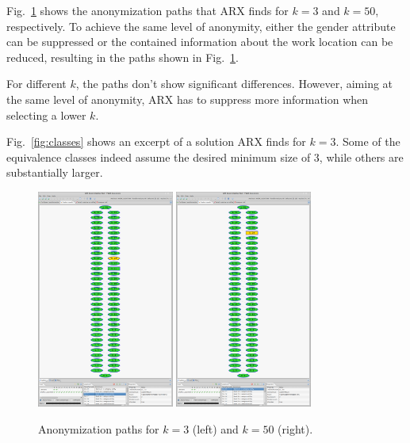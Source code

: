 \documentclass[parskip=full]{scrartcl}
\begin{document}
Fig.~\ref{fig:paths} shows the anonymization paths that ARX finds for $k=3$ and $k=50$, respectively. To achieve the same level of anonymity, either the gender attribute can be suppressed or the contained information about the work location can be reduced, resulting in the paths shown in Fig.~\ref{fig:paths}.

For different $k$, the paths don't show significant differences. However, aiming at the same level of anonymity, ARX has to suppress more information when selecting a lower $k$.

Fig.~\ref{fig:classes} shows an excerpt of a solution ARX finds for $k=3$. Some of the equivalence classes indeed assume the desired minimum size of 3, while others are substantially larger.

\begin{figure}
\centering
\includegraphics[trim=10cm 9cm 10cm 4.4cm, clip,width=0.4\textwidth]{figures/k=3_paths.png}
\includegraphics[trim=10cm 9cm 10cm 4.4cm, clip,width=0.4\textwidth]{figures/k=50_paths.png}
\caption{Anonymization paths for $k=3$ (left) and $k=50$ (right).}
\label{fig:paths}
\end{figure}


\end{document}
